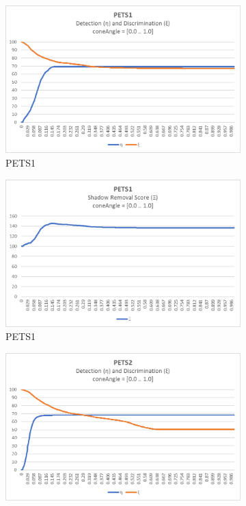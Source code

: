 \begin{appendices}
\begin{figure}
  \begin{subfigure}{.45\linewidth}
  \includegraphics[width=1\linewidth]{figures/appendix/pets1_coneAngle_response.jpg}
  \caption{PETS1}
\end{subfigure}
\hfill
\begin{subfigure}{.45\linewidth}
  \includegraphics[width=1\linewidth]{figures/appendix/pets1_coneAngle_score.jpg}
  \caption{PETS1}
\end{subfigure}
\hfill
\begin{subfigure}{.45\linewidth}
  \includegraphics[width=1\linewidth]{figures/appendix/pets2_coneAngle_response.jpg}

\end{subfigure}
\end{figure}
\end{appendices}
